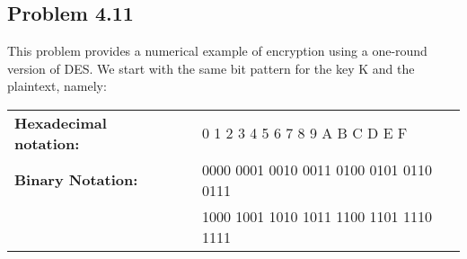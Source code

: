 \documentclass[../hw_sols.tex]{subfiles}
\begin{document}
\newpage



\subsection*{Problem 4.11}

This problem provides a numerical example of encryption using a one-round 
version of DES. We start with the same bit pattern for the key K and the 
plaintext, namely:

\begin{center}
\begin{tabular} { l c l }
	\textbf{Hexadecimal notation:} & \qquad 
	& 0 1 2 3 4 5 6 7 8 9 A B C D E F \\
	\textbf{Binary Notation:} & \qquad 
	& 0000 0001 0010 0011 0100 0101 0110 0111 \\
	& \qquad & 1000 1001 1010 1011 1100 1101 1110 1111
\end{tabular}
\end{center}
\end{document}
